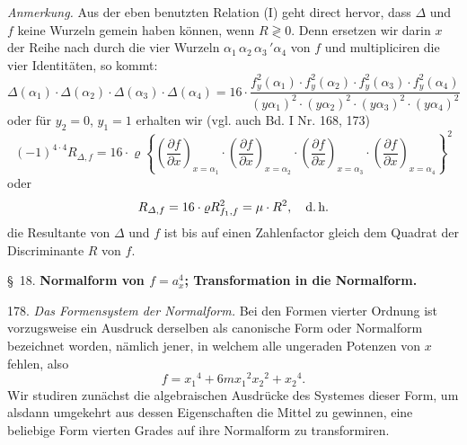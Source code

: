 \documentclass[11pt]{article}
\providecommand{\weberpage}[1]{}
\let\Delta\varDelta
\begin{document}
\textit{Anmerkung.} Aus der eben benutzten Relation (I) geht direct hervor, dass $\Delta$ und $f$ keine Wurzeln gemein haben können, wenn $R\gtrless 0$. Denn ersetzen wir darin $x$ der Reihe nach durch die vier Wurzeln $\alpha_1\,\alpha_2\,\alpha_3\,'\alpha_4$ von $f$ und multipliciren die vier Identitäten, so kommt: %
\[
\Delta(\alpha_1)\cdot\Delta(\alpha_2)\cdot\Delta(\alpha_3)\cdot\Delta(\alpha_4)=16\cdot\frac{f_y^2(\alpha_1)\cdot f_y^2(\alpha_2)\cdot f_y^2(\alpha_3)\cdot f_y^2(\alpha_4)}{(y\alpha_1)^2\cdot(y\alpha_2)^2\cdot(y\alpha_3)^2\cdot(y\alpha_4)^2}
\]
oder für $y_2=0$, $y_1=1$ erhalten wir (vgl. auch Bd. I Nr. 168, 173)
\[
(-1)^{4\cdot4}R_{\Delta,f}=16\cdot\varrho\left\{\left(\frac{\partial f}{\partial x}\right)_{x=\alpha_1}\cdot\left(\frac{\partial f}{\partial x}\right)_{x=\alpha_2}\cdot\left(\frac{\partial f}{\partial x}\right)_{x=\alpha_3}\cdot\left(\frac{\partial f}{\partial x}\right)_{x=\alpha_4}\right\}^2
\]
oder
\[
R_{\Delta,f}=16\cdot\varrho R_{f_1,f}^2=\mu\cdot R^2,\quad\text{d.\,h.}
\]
\glqq die Resultante von $\Delta$ und $f$ ist bis auf einen Zahlenfactor gleich dem Quadrat der Discriminante $R$ von $f$.\grqq{}


\weberpage{198}
\S~18. \textbf{Normalform von $f=a_x^4$; Transformation in die Normalform.}

178. \textit{Das Formensystem der Normalform.} Bei den Formen vierter Ordnung ist vorzugsweise ein Ausdruck derselben als canonische Form oder Normalform bezeichnet worden, nämlich jener, in welchem alle ungeraden Potenzen von $x$ fehlen, also
\[
f=x_1{}^4+6mx_1{}^2x_2{}^2+x_2{}^4.
\]
Wir studiren zunächst die algebraischen Ausdrücke des Systemes dieser Form, um alsdann umgekehrt aus dessen Eigenschaften die Mittel zu gewinnen, eine beliebige Form vierten Grades auf ihre Normalform zu transformiren.
\end{document}
